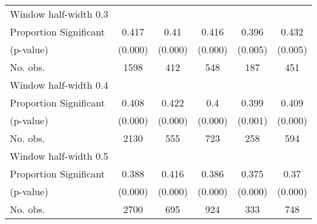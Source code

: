 \begin{tabular}{l*{5}{c}}
\hline
Window half-width 0.3\\

Proportion Significant& 0.417 &  0.41 &  0.416 &  0.396 &  0.432\\

(p-value) & (0.000) &  (0.000) &  (0.000) &  (0.005) &  (0.005)\\

No. obs.& 1598 &  412 &  548 &  187 &  451\\

\hline
Window half-width 0.4\\

Proportion Significant& 0.408 &  0.422 &  0.4 &  0.399 &  0.409\\

(p-value) & (0.000) &  (0.000) &  (0.000) &  (0.001) &  (0.000)\\

No. obs.& 2130 &  555 &  723 &  258 &  594\\

\hline
Window half-width 0.5\\

Proportion Significant& 0.388 &  0.416 &  0.386 &  0.375 &  0.37\\

(p-value) & (0.000) &  (0.000) &  (0.000) &  (0.000) &  (0.000)\\

No. obs.& 2700 &  695 &  924 &  333 &  748\\

\hline\hline
\end{tabular}

